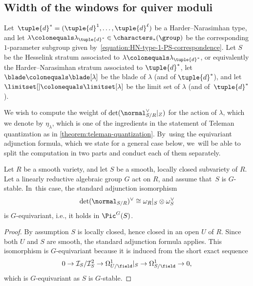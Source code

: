 \subsection{Width of the windows for quiver moduli}
\label{subsection:width}
Let~$\tuple{d}^*=(\tuple{d}^1,\ldots,\tuple{d}^\ell)$ be a Harder--Narasimhan type,
and let $\lambda \colonequals \lambda_{\tuple{d}^*} \in \characters_*({\group})$ be
the corresponding $1$\nobreakdash-parameter subgroup given by~\eqref{equation:HN-type-1-PS-correspondence}.
Let $S$ be the Hesselink stratum associated to $\lambda\colonequals\lambda_{\tuple{d}^*}$,
or equivalently the Harder--Narasimhan stratum associated to $\tuple{d}^*$,
let $\blade\colonequals\blade[\lambda]$ be the blade of $\lambda$ (and of $\tuple{d}^*$),
and let~$\limitset[]\colonequals\limitset[\lambda]$ be the limit set of $\lambda$ (and of~$\tuple{d}^*$).

We wish to compute the weight of $\det(\normal_{S/R}^\vee|_Z)$
for the action of $\lambda$,
which we denote by $\eta_\lambda$,
which is one of the ingredients in the statement of Teleman quantization as in \cref{theorem:teleman-quantization}. By~using the equivariant adjunction formula,
which we state for a general case below, we~will be able to split the computation in two parts and conduct each of them separately.
\begin{lemma}
\label{lemma:determinant-normal-bundle-sequence}
Let $R$ be a smooth variety,
and let $S$ be a smooth, locally closed subvariety of $R$.
Let a linearly reductive algebraic group $G$ act on $R$,
and assume that~$S$ is $G$-stable. In~this case, the standard adjunction isomorphism
\begin{equation}
\label{equation:equivariant-adjunction}
\det(\normal_{S/R})^\vee \cong \omega_R|_S \otimes \omega_S^\vee
\end{equation}
is $G$-equivariant, i.e., it holds in $\Pic^G(S)$.
\end{lemma}

\begin{proof}
By assumption $S$ is locally closed,
hence closed in an open $U$ of $R$.
Since both $U$ and $S$ are smooth,
the standard adjunction formula applies. This isomorphism is $G$-equivariant because it is induced from the short exact sequence
\begin{equation*}
0 \to \mathcal{I}_{S}/\mathcal{I}^2_{S} \to \Omega^{1}_{U/\field}|_{S} \to \Omega^{1}_{S/\field} \to 0,
\end{equation*}
which is $G$-equivariant as $S$ is $G$-stable.
\end{proof}


